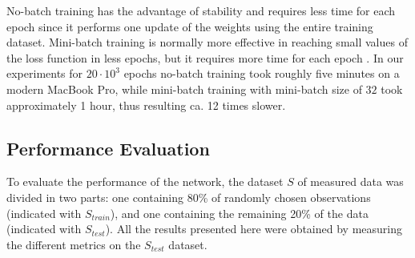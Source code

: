 \documentclass[sensors,article,submit,moreauthors,pdftex,10pt,a4paper]{Definitions/mdpi}
\begin{document}
No-batch training has the advantage of stability and requires less time for each epoch since it performs one update of the weights using the entire training dataset. Mini-batch training is normally more effective in reaching small values of the loss function in less epochs, but it requires more time for each epoch \cite{Michelucci2017}. In our experiments for $20 \cdot 10^3$ epochs no-batch training took roughly five minutes on a modern MacBook Pro, while mini-batch training with  mini-batch size of $32$ took approximately 1 hour, thus resulting ca. 12 times slower. 


\subsection{Performance Evaluation}

To evaluate the performance of the network, the dataset $S$ of measured data was divided in two parts: one containing 80\% of randomly chosen observations (indicated with $S_{train}$), and one containing the remaining 20\% of the data (indicated with $S_{test}$). All the results presented here were obtained by measuring the different metrics on the $S_{test}$ dataset.


\end{document}
